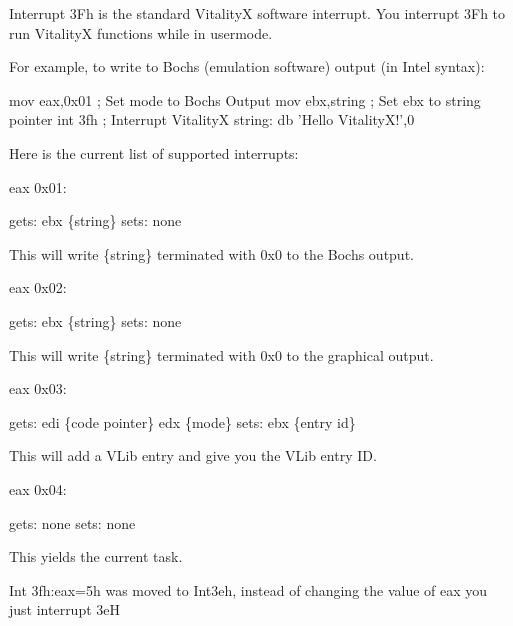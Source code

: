 Interrupt 3\+Fh is the standard VitalityX software interrupt. You interrupt 3\+Fh to run VitalityX functions while in usermode.

For example, to write to Bochs (emulation software) output (in Intel syntax)\+: 
\begin{DoxyCode}
        mov eax,0x01 ; Set mode to Bochs Output
        mov ebx,string ; Set ebx to string pointer
        int 3fh ; Interrupt VitalityX
string: db 'Hello VitalityX!',0
\end{DoxyCode}


Here is the current list of supported interrupts\+:


\begin{DoxyCode}
eax 0x01:

gets:
ebx \{string\}
sets:
none

This will write \{string\} terminated with 0x0 to the Bochs output.

eax 0x02:

gets:
ebx \{string\}
sets:
none

This will write \{string\} terminated with 0x0 to the graphical output.

eax 0x03:

gets:
edi \{code pointer\}
edx \{mode\}
sets:
ebx \{entry id\}

This will add a VLib entry and give you the VLib entry ID.

eax 0x04:

gets:
none
sets:
none

This yields the current task.

Int 3fh:eax=5h was moved to Int3eh, instead of changing the value of eax you just interrupt 3eH
\end{DoxyCode}
 